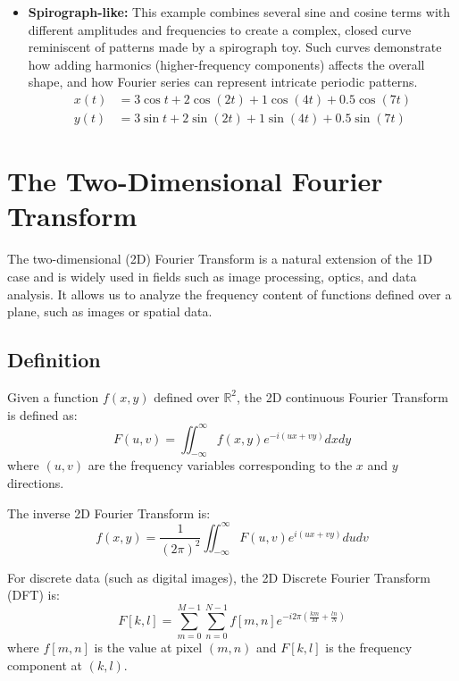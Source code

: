 \documentclass[11pt,a4paper]{article}
\begin{document}
\begin{itemize}
    \item \textbf{Spirograph-like:} This example combines several sine and cosine terms with different amplitudes and frequencies to create a complex, closed curve reminiscent of patterns made by a spirograph toy. Such curves demonstrate how adding harmonics (higher-frequency components) affects the overall shape, and how Fourier series can represent intricate periodic patterns.
    \begin{align}
        x(t) &= 3\cos t + 2\cos(2t) + 1\cos(4t) + 0.5\cos(7t) \\
        y(t) &= 3\sin t + 2\sin(2t) + 1\sin(4t) + 0.5\sin(7t)
    \end{align}
\end{itemize}

\section{The Two-Dimensional Fourier Transform}

The two-dimensional (2D) Fourier Transform is a natural extension of the 1D case and is widely used in fields such as image processing, optics, and data analysis. It allows us to analyze the frequency content of functions defined over a plane, such as images or spatial data.

\subsection{Definition}

Given a function $f(x, y)$ defined over $\mathbb{R}^2$, the 2D continuous Fourier Transform is defined as:
\begin{equation}
F(u, v) = \iint_{-\infty}^{\infty} f(x, y) e^{-i(ux + vy)} dx dy
\end{equation}
where $(u, v)$ are the frequency variables corresponding to the $x$ and $y$ directions.

The inverse 2D Fourier Transform is:
\begin{equation}
f(x, y) = \frac{1}{(2\pi)^2} \iint_{-\infty}^{\infty} F(u, v) e^{i(ux + vy)} du dv
\end{equation}

For discrete data (such as digital images), the 2D Discrete Fourier Transform (DFT) is:
\begin{equation}
F[k, l] = \sum_{m=0}^{M-1} \sum_{n=0}^{N-1} f[m, n] e^{-i 2\pi (\frac{km}{M} + \frac{ln}{N})}
\end{equation}
where $f[m, n]$ is the value at pixel $(m, n)$ and $F[k, l]$ is the frequency component at $(k, l)$.
\end{document}

